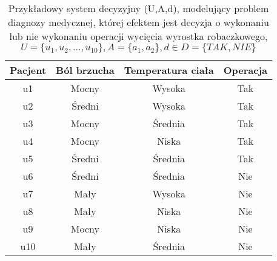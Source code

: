\documentclass[a4paper]{article}
\begin{document}
\begin{table}[h]
\centering\caption{Przykładowy system decyzyjny (U,A,d), modelujący problem diagnozy medycznej, której efektem jest decyzja o wykonaniu lub nie wykonaniu operacji wycięcia wyrostka robaczkowego, $U = \{u_{1},u_{2},...,u_{10}\}, A = \{a_{1},a_{2}\}, d \in D=\{TAK, NIE\}$}
\begin{tabular}{c|c c c}
        \hline
        \hline
        Pacjent & Ból brzucha & Temperatura ciała & Operacja\\
        \hline
        u1 & Mocny & Wysoka & Tak\\
        u2 & Średni & Wysoka & Tak\\
        u3 & Mocny & Średnia & Tak\\
        u4 & Mocny & Niska & Tak\\
        u5 & Średni & Średnia & Tak\\
        u6 & Średni & Średnia & Nie\\
        u7 & Mały & Wysoka & Nie\\
        u8 & Mały & Niska & Nie\\
        u9 & Mocny & Niska & Nie\\
        u10 & Mały & Średnia & Nie\\
        \hline
        \hline
\end{tabular}        
\end{table}        
\end{document}
